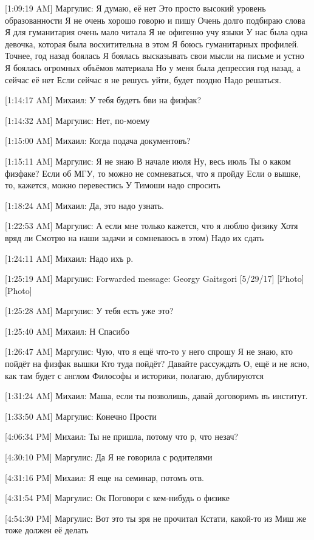\documentclass{article}
\newcommand{\yat}{{\fontencoding{X2}\selectfont\cyryat}} %
\begin{document}
{[1:09:19 AM] Маргулис:
Я думаю, её нет
 Это просто высокий уровень образованности
 Я не очень хорошо говорю и пишу
 Очень долго подбираю слова
 Я для гуманитария очень мало читала
 Я не офигенно учу языки
 У нас была одна девочка, которая была восхитительна в этом
 Я боюсь гуманитарных профилей.
 Точнее, год назад боялась
 Я боялась высказывать свои мысли на письме и устно
 Я боялась огромных объёмов материала
 Но у меня была депрессия год назад, а сейчас её нет
 Если сейчас я не решусь уйти, будет поздно
 Надо решаться.

[1:14:17 AM] Михаил:
У тебя будетъ бви на физфак\yat?

[1:14:32 AM] Маргулис:
Нет, по-моему

[1:15:00 AM] Михаил:
Когда подача документовъ?

[1:15:11 AM] Маргулис:
Я не знаю
 В начале июля
 Ну, весь июль
 Ты о каком физфаке? Если об МГУ, то можно не сомневаться, что я пройду
 Если о вышке, то, кажется, можно перевестись
 У Тимоши надо спросить

[1:18:24 AM] Михаил:
Да, это надо узнать.

[1:22:53 AM] Маргулис:
А если мне только кажется, что я люблю физику
 Хотя вряд ли
 Смотрю на наши задачи и сомневаюсь в этом)
 Надо их сдать

[1:24:11 AM] Михаил:
Надо ихъ р.

[1:25:19 AM] Маргулис:
Forwarded message: 
Georgy Gaitsgori [5/29/17] 
[Photo]
[Photo]

[1:25:28 AM] Маргулис:
У тебя есть уже это?

[1:25:40 AM] Михаил:
Н
 Спасибо

[1:26:47 AM] Маргулис:
Чую, что я ещё что-то у него спрошу
 Я не знаю, кто пойдёт на физфак вышки
 Кто туда пойдёт?
 Давайте рассуждать
 О, ещё и не ясно, как там будет с англом
 Философы и историки, полагаю, дублируются

[1:31:24 AM] Михаил:
Маша, если ты позволишь, давай договоримъ въ институт\yat.

[1:33:50 AM] Маргулис:
Конечно
 Прости

[4:06:34 PM] Михаил:
Ты не пришла, потому что р, что незач?

[4:30:10 PM] Маргулис:
Да
 Я не говорила с родителями

[4:31:16 PM] Михаил:
Я еще на семинар\yat, потомъ отв.

[4:31:54 PM] Маргулис:
Ок
 Поговори с кем-нибудь о физике

[4:54:30 PM] Маргулис:
Вот это ты зря не прочитал
 Кстати, какой-то из Миш же тоже должен её делать

}
\end{document}
